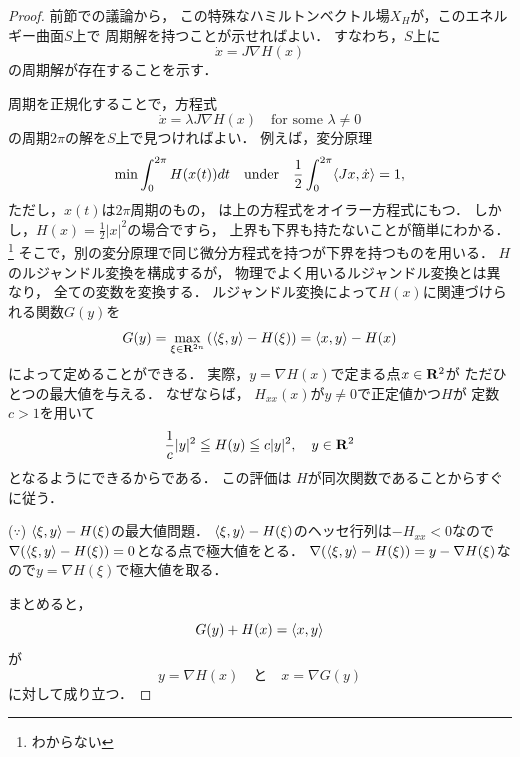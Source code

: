 \begin{proof}
    前節での議論から，
    この特殊なハミルトンベクトル場\(X_H\)が，このエネルギー曲面\(S\)上で
    周期解を持つことが示せればよい．
    すなわち，\(S\)上に
    \[
        \dot{x}=J\nabla H(x)
    \]
    の周期解が存在することを示す．

    周期を正規化することで，方程式
    \begin{equation}
        \dot{x}=\lambda J\nabla H(x) \quad \text{for some \(\lambda\ne0\)}
    \end{equation}
    の周期\(2\pi\)の解を\(S\)上で見つければよい．
    例えば，変分原理
    \[
        \min\int_{0}^{2\pi}H(x(t))dt 
        \quad
        \text{under}
        \quad
        \frac{1}{2}
        \int_{0}^{2\pi}\inner<Jx,\dot{x}>=1,
    \]
    ただし，\(x(t)\)は\(2\pi\)周期のもの，
    は上の方程式をオイラー方程式にもつ．
    しかし，\(H(x)=\frac{1}{2}\lvert{x}\rvert^2\)の場合ですら，
    上界も下界も持たないことが簡単にわかる．\footnote{わからない}
    そこで，別の変分原理で同じ微分方程式を持つが下界を持つものを用いる．
    \(H\)のルジャンドル変換を構成するが，
    物理でよく用いるルジャンドル変換とは異なり，
    全ての変数を変換する．
    ルジャンドル変換によって\(H(x)\)に関連づけられる関数\(G(y)\)を
    \[
        G(y)=\max_{\xi\in\rr^{2n}}\left(
            \inner<\xi,y>-H(\xi)
        \right)
        =\inner<x,y>-H(x)
    \]
    によって定めることができる．
    実際，\(y=\nabla H(x)\)で定まる点\(x\in\mathbf{R}^2\)が
    ただひとつの最大値を与える．
    なぜならば，
    \(H_{xx}(x)\)が\(y\ne0\)で正定値かつ\(H\)が
    定数\(c>1\)を用いて
    \begin{equation}
        \frac{1}{c}\lvert{y}\rvert^{2}
        \leqq
        H(y)
        \leqq
        c\lvert{y}\rvert^{2},\quad y\in\mathbf{R}^2
    \end{equation}
    となるようにできるからである．
    この評価は
    \(H\)が同次関数であることからすぐに従う．
    \begin{redleftbar}
        (\(\because\)) 
        \(\inner<\xi,y>-H(\xi)\)の最大値問題．
        \(\inner<\xi,y>-H(\xi)\)のヘッセ行列は\(-H_{xx}<0\)なので
        \(\nabla(\inner<\xi,y>-H(\xi))=0\)となる点で極大値をとる．
        \(
            \nabla(\inner<\xi,y>-H(\xi))
            =y-\nabla H(\xi)
        \)なので\(y=\nabla H(\xi)\)で極大値を取る．
    \end{redleftbar}
    まとめると，
    \begin{equation}
        G(y)+H(x)=\inner<x,y>
    \end{equation}
    が\begin{equation}
        y=\nabla H(x)\quad\text{と}\quad x=\nabla G(y)
    \end{equation}
    に対して成り立つ．


\end{proof}
